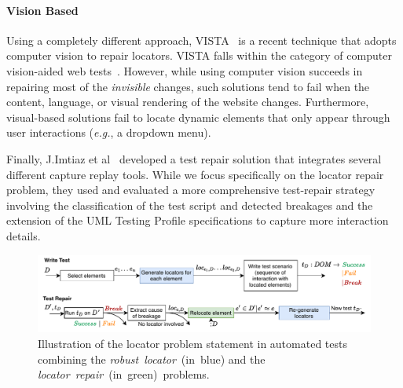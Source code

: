 \paragraph{Vision Based}
Using a completely different approach, VISTA~\cite{stocco2018visual} is a recent technique that adopts computer vision to repair locators. VISTA falls within the category of computer vision-aided web tests~\cite{chang2010gui,leotta2018pesto,alegroth2013jautomate}.
However, while using computer vision succeeds in repairing most of the \textit{invisible} changes, such solutions tend to fail when the content, language, or visual rendering of the website changes.
Furthermore, visual-based solutions fail to locate dynamic elements that only appear through user interactions (\emph{e.g.}, a dropdown menu).

Finally, J.Imtiaz et al~\cite{imtiaz2021automated} developed a test repair
solution that integrates several different capture replay tools. While we
focus specifically on the locator repair problem, they used and evaluated a more comprehensive test-repair strategy involving the classification of the test script and
detected breakages and the extension of the UML Testing Profile specifications to
capture more interaction details.


\begin{figure}
    \centering
    \includegraphics[width=1\linewidth]{erratum/locator-repair}
    \caption{Illustration of the locator problem statement in automated tests combining the \emph{robust~locator}~(in~blue) and the \emph{locator~repair}~(in~green)~problems.}
    \label{fig:locator_repair}
\end{figure} 

